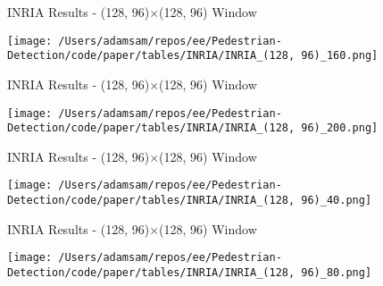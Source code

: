 \begin{table}
    \caption{INRIA Results - (128, 96)$\times$(128, 96) Window}
    \texttt{[image: /Users/adamsam/repos/ee/Pedestrian-Detection/code/paper/tables/INRIA/INRIA\_(128, 96)\_160.png]}
    \label{tab:INRIA_(128, 96)_160}
\end{table}

\begin{table}
    \caption{INRIA Results - (128, 96)$\times$(128, 96) Window}
    \texttt{[image: /Users/adamsam/repos/ee/Pedestrian-Detection/code/paper/tables/INRIA/INRIA\_(128, 96)\_200.png]}
    \label{tab:INRIA_(128, 96)_200}
\end{table}

\begin{table}
    \caption{INRIA Results - (128, 96)$\times$(128, 96) Window}
    \texttt{[image: /Users/adamsam/repos/ee/Pedestrian-Detection/code/paper/tables/INRIA/INRIA\_(128, 96)\_40.png]}
    \label{tab:INRIA_(128, 96)_40}
\end{table}

\begin{table}
    \caption{INRIA Results - (128, 96)$\times$(128, 96) Window}
    \texttt{[image: /Users/adamsam/repos/ee/Pedestrian-Detection/code/paper/tables/INRIA/INRIA\_(128, 96)\_80.png]}
    \label{tab:INRIA_(128, 96)_80}
\end{table}
